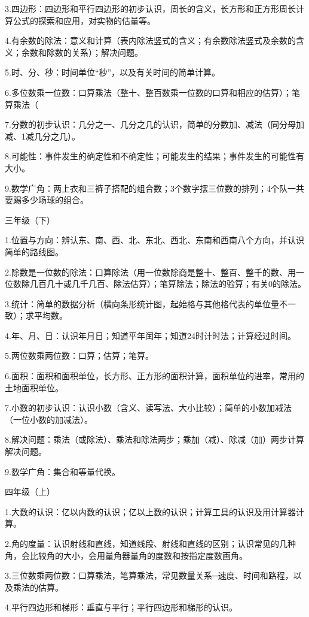 3.四边形：四边形和平行四边形的初步认识，周长的含义，长方形和正方形周长计算公式的探索和应用，对实物的估量等。

4.有余数的除法：意义和计算（表内除法竖式的含义；有余数除法竖式及余数的含义；余数和除数的关系）；解决问题。

5.时、分、秒：时间单位“秒”，以及有关时间的简单计算。

6.多位数乘一位数：口算乘法（整十、整百数乘一位数的口算和相应的估算）；笔算乘法（

7.分数的初步认识：几分之一、几分之几的认识，简单的分数加、减法（同分母加减、1减几分之几）。

8.可能性：事件发生的确定性和不确定性；可能发生的结果；事件发生的可能性有大小。

9.数学广角：两上衣和三裤子搭配的组合数；3个数字摆三位数的排列；4个队一共要踢多少场球的组合。

三年级（下）

1.位置与方向：辨认东、南、西、北、东北、西北、东南和西南八个方向，并认识简单的路线图。

2.除数是一位数的除法：口算除法（用一位数除商是整十、整百、整千的数、用一位数除几百几十或几千几百、除法估算）；笔算除法；除法的验算；有关0的除法。

3.统计：简单的数据分析（横向条形统计图，起始格与其他格代表的单位量不一致）；求平均数。

4.年、月、日：认识年月日；知道平年闰年；知道24时计时法；计算经过时间。

5.两位数乘两位数：口算；估算；笔算。

6.面积：面积和面积单位，长方形、正方形的面积计算，面积单位的进率，常用的土地面积单位。

7.小数的初步认识：认识小数（含义、读写法、大小比较）；简单的小数加减法（一位小数的加减法）。

8.解决问题：乘法（或除法）、乘法和除法两步；乘加（减）、除减（加）两步计算解决问题。

9.数学广角：集合和等量代换。

四年级（上）

1.大数的认识：亿以内数的认识；亿以上数的认识；计算工具的认识及用计算器计算。

2.角的度量：认识射线和直线，知道线段、射线和直线的区别；认识常见的几种角，会比较角的大小，会用量角器量角的度数和按指定度数画角。

3.三位数乘两位数：口算乘法，笔算乘法，常见数量关系─速度、时间和路程，以及乘法的估算。

4.平行四边形和梯形：垂直与平行；平行四边形和梯形的认识。

